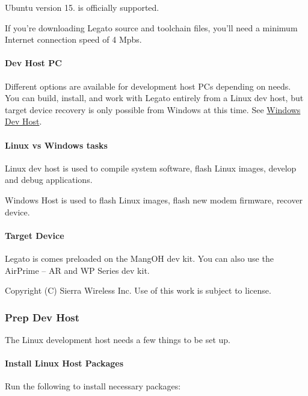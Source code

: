 Ubuntu version 15. is officially supported.

If you’re downloading Legato source and toolchain files, you’ll need a minimum Internet connection speed of 4 Mpbs.\hypertarget{getstarted_c_lrequirements_getstartedCLrequirements_Host}{}\paragraph{Dev Host P\+C}\label{getstarted_c_lrequirements_getstartedCLrequirements_Host}
Different options are available for development host P\+Cs depending on needs. You can build, install, and work with Legato entirely from a Linux dev host, but target device recovery is only possible from Windows at this time. See \hyperlink{getstartedWindowsHost}{Windows Dev Host}.\hypertarget{getstarted_c_lrequirements_getstartedCLrequirements_tasks}{}\paragraph{Linux vs Windows tasks}\label{getstarted_c_lrequirements_getstartedCLrequirements_tasks}
Linux dev host is used to compile system software, flash Linux images, develop and debug applications.

Windows Host is used to flash Linux images, flash new modem firmware, recover device.\hypertarget{getstarted_c_lrequirements_getstartedCLrequirements_target}{}\paragraph{Target Device}\label{getstarted_c_lrequirements_getstartedCLrequirements_target}
Legato is comes preloaded on the Mang\+O\+H dev kit. You can also use the Air\+Prime – A\+R and W\+P Series dev kit. ~\newline






Copyright (C) Sierra Wireless Inc. Use of this work is subject to license. \hypertarget{getstartedPrepDevHost}{}\subsubsection{Prep Dev Host}\label{getstartedPrepDevHost}
The Linux development host needs a few things to be set up.\hypertarget{getstarted_prep_dev_host_instLinuxPackages}{}\paragraph{Install Linux Host Packages}\label{getstarted_prep_dev_host_instLinuxPackages}
Run the following to install necessary packages\+:


